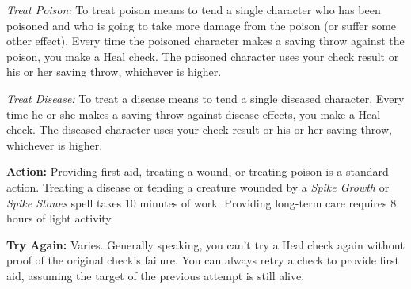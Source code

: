 \textit{Treat Poison:} To treat poison means to tend a single character who has been poisoned and who is going to take more damage from the poison (or suffer some other effect). Every time the poisoned character makes a saving throw against the poison, you make a Heal check. The poisoned character uses your check result or his or her saving throw, whichever is higher.

\textit{Treat Disease:} To treat a disease means to tend a single diseased character. Every time he or she makes a saving throw against disease effects, you make a Heal check. The diseased character uses your check result or his or her saving throw, whichever is higher.

\textbf{Action:} Providing first aid, treating a wound, or treating poison is a standard action. Treating a disease or tending a creature wounded by a \textit{Spike Growth} or \textit{Spike Stones} spell takes 10 minutes of work. Providing long-term care requires 8 hours of light activity.

\textbf{Try Again:} Varies. Generally speaking, you can't try a Heal check again without proof of the original check's failure. You can always retry a check to provide first aid, assuming the target of the previous attempt is still alive.
